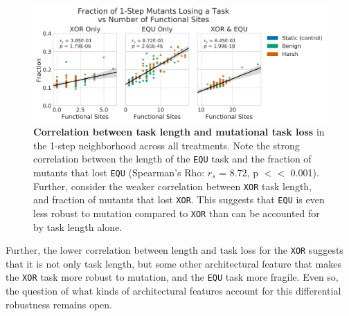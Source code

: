 \documentclass[10pt,letterpaper,final]{article}
\begin{document}
	\begin{figure}[!h] %
	\includegraphics[width=0.95\columnwidth]{figures/CE/CCE_frac_1step_vs_func_sites.png}
	\caption{\textbf{Correlation between task length and mutational task loss} in the 1-step neighborhood across all treatments. Note the strong correlation between the length of the \texttt{EQU} task and the fraction of mutants that lost \texttt{EQU} (Spearman's Rho: $r_s$ = 8.72, p $<<$ 0.001). Further, consider the weaker correlation between \texttt{XOR} task length, and fraction of mutants that lost \texttt{XOR}. This suggests that \texttt{EQU} is even less robust to mutation compared to \texttt{XOR} than can be accounted for by task length alone.  
	}\label{fig:CCE_func_vs_single_step}
	\end{figure}	

Further, the lower correlation between length and task loss for the \texttt{XOR} suggests that it is not only task length, but some other architectural feature that makes the \texttt{XOR} task more robust to mutation, and the \texttt{EQU} task more fragile. Even so, the question of what kinds of architectural features account for this differential robustness remains open.
\end{document}
